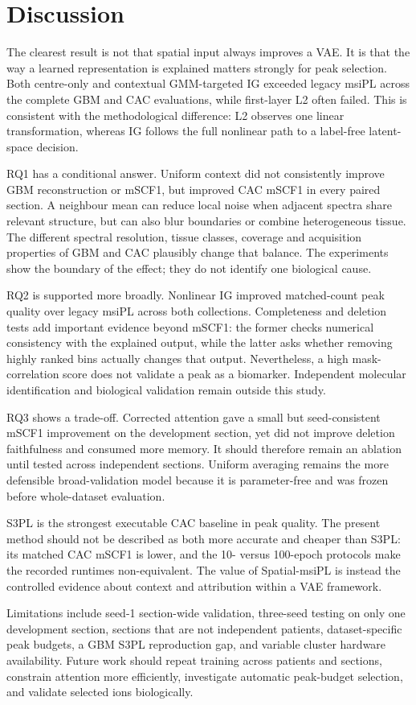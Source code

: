 \section{Discussion}
\label{sec:discussion}

The clearest result is not that spatial input always improves a VAE. It is that
the way a learned representation is explained matters strongly for peak
selection. Both centre-only and contextual GMM-targeted IG exceeded legacy
msiPL across the complete GBM and CAC evaluations, while first-layer L2 often
failed. This is consistent with the methodological difference: L2 observes one
linear transformation, whereas IG follows the full nonlinear path to a
label-free latent-space decision.

RQ1 has a conditional answer. Uniform context did not consistently improve GBM
reconstruction or mSCF1, but improved CAC mSCF1 in every paired section. A
neighbour mean can reduce local noise when adjacent spectra share relevant
structure, but can also blur boundaries or combine heterogeneous tissue. The
different spectral resolution, tissue classes, coverage and acquisition
properties of GBM and CAC plausibly change that balance. The experiments show
the boundary of the effect; they do not identify one biological cause.

RQ2 is supported more broadly. Nonlinear IG improved matched-count peak quality
over legacy msiPL across both collections. Completeness and deletion tests add
important evidence beyond mSCF1: the former checks numerical consistency with
the explained output, while the latter asks whether removing highly ranked bins
actually changes that output. Nevertheless, a high mask-correlation score does
not validate a peak as a biomarker. Independent molecular identification and
biological validation remain outside this study.

RQ3 shows a trade-off. Corrected attention gave a small but seed-consistent
mSCF1 improvement on the development section, yet did not improve deletion
faithfulness and consumed more memory. It should therefore remain an ablation
until tested across independent sections. Uniform averaging remains the more
defensible broad-validation model because it is parameter-free and was frozen
before whole-dataset evaluation.

S3PL is the strongest executable CAC baseline in peak quality. The present
method should not be described as both more accurate and cheaper than S3PL: its
matched CAC mSCF1 is lower, and the 10- versus 100-epoch protocols make the
recorded runtimes non-equivalent. The value of Spatial-msiPL is instead the
controlled evidence about context and attribution within a VAE framework.

Limitations include seed-1 section-wide validation, three-seed testing on only
one development section, sections that are not independent patients,
dataset-specific peak budgets, a GBM S3PL reproduction gap, and variable
cluster hardware availability. Future work should repeat training across
patients and sections, constrain attention more efficiently, investigate
automatic peak-budget selection, and validate selected ions biologically.
